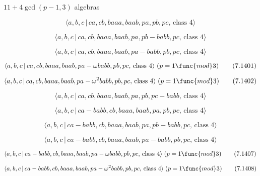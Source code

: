 \documentclass[10pt]{article}
\begin{document}
$11+4\gcd (p-1,3)$ algebras

\begin{equation}
\langle a,b,c\,|\,ca,cb,baaa,baab,pa,pb,pc,\,\text{class }4\rangle 
\tag{7.1398}
\end{equation}

\begin{equation}
\langle a,b,c\,|\,ca,cb,baaa,baab,pa,pb-babb,pc,\,\text{class }4\rangle 
\tag{7.1399}
\end{equation}

\begin{equation}
\langle a,b,c\,|\,ca,cb,baaa,baab,pa-babb,pb,pc,\,\text{class }4\rangle 
\tag{7.1400}
\end{equation}

\begin{equation}
\langle a,b,c\,|\,ca,cb,baaa,baab,pa-\omega babb,pb,pc,\,\text{class }%
4\rangle \;(p=1\func{mod}3)  \tag{7.1401}
\end{equation}

\begin{equation}
\langle a,b,c\,|\,ca,cb,baaa,baab,pa-\omega ^{2}babb,pb,pc,\,\text{class }%
4\rangle \;(p=1\func{mod}3)  \tag{7.1402}
\end{equation}

\begin{equation}
\langle a,b,c\,|\,ca,cb,baaa,baab,pa,pb,pc-babb,\,\text{class }4\rangle 
\tag{7.1403}
\end{equation}

\begin{equation}
\langle a,b,c\,|\,ca-babb,cb,baaa,baab,pa,pb,pc,\,\text{class }4\rangle 
\tag{7.1404}
\end{equation}

\begin{equation}
\langle a,b,c\,|\,ca-babb,cb,baaa,baab,pa,pb-babb,pc,\,\text{class }4\rangle
\tag{7.1405}
\end{equation}

\begin{equation}
\langle a,b,c\,|\,ca-babb,cb,baaa,baab,pa-babb,pb,pc,\,\text{class }4\rangle
\tag{7.1406}
\end{equation}

\begin{equation}
\langle a,b,c\,|\,ca-babb,cb,baaa,baab,pa-\omega babb,pb,pc,\,\text{class }%
4\rangle \;(p=1\func{mod}3)  \tag{7.1407}
\end{equation}

\begin{equation}
\langle a,b,c\,|\,ca-babb,cb,baaa,baab,pa-\omega ^{2}babb,pb,pc,\,\text{%
class }4\rangle \;(p=1\func{mod}3)  \tag{7.1408}
\end{equation}
\end{document}
